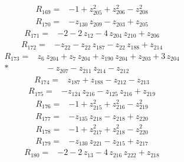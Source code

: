 \documentclass[10pt]{article}
\begin{document}
\begin{align*}
R_{169}={}& - 1 + z_{205}^{2} + z_{206}^{2} - z_{208}^{2}
\end{align*}
\begin{align*}
R_{170}={}& - z_{130}\,z_{209} - z_{203} + z_{205}
\end{align*}
\begin{align*}
R_{171}={}& - 2 - 2\,z_{12} - 4\,z_{204}\,z_{210} + z_{206}
\end{align*}
\begin{align*}
R_{172}={}& - z_{22} - z_{22}\,z_{187} - z_{22}\,z_{188} + z_{214}
\end{align*}
\begin{align*}
R_{173}={}& z_{6}\,z_{204} + z_{7}\,z_{204} + z_{190}\,z_{204} + z_{203} + 3\,z_{204} \\*
&\quad - z_{207} - z_{211}\,z_{214} - z_{212}
\end{align*}
\begin{align*}
R_{174}={}& z_{187} + z_{188} - z_{212} - z_{213}
\end{align*}
\begin{align*}
R_{175}={}& - z_{124}\,z_{216} - z_{125}\,z_{216} + z_{219}
\end{align*}
\begin{align*}
R_{176}={}& - 1 + z_{215}^{2} + z_{216}^{2} - z_{219}^{2}
\end{align*}
\begin{align*}
R_{177}={}& - z_{135}\,z_{218} - z_{218} + z_{220}
\end{align*}
\begin{align*}
R_{178}={}& - 1 + z_{217}^{2} + z_{218}^{2} - z_{220}^{2}
\end{align*}
\begin{align*}
R_{179}={}& - z_{130}\,z_{221} - z_{215} + z_{217}
\end{align*}
\begin{align*}
R_{180}={}& - 2 - 2\,z_{13} - 4\,z_{216}\,z_{222} + z_{218}
\end{align*}
\end{document}
